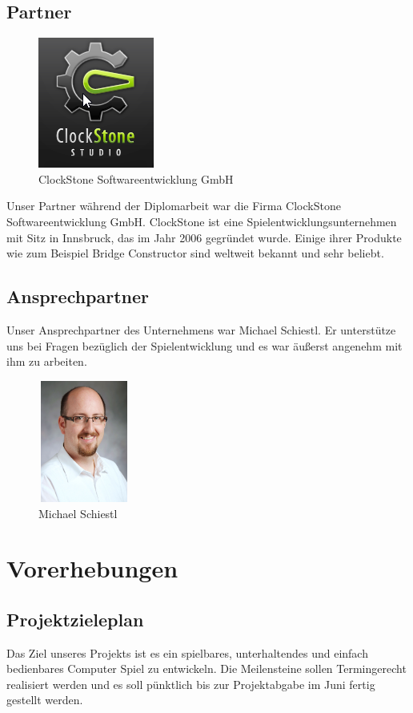 \newpage
\subsection{Partner}
\begin{figure}[H]
	\centering
	\includegraphics[]{images/ClockstoneLogo.png}
	\caption{ClockStone Softwareentwicklung GmbH}
\end{figure}
Unser Partner während der Diplomarbeit war die Firma ClockStone Softwareentwicklung GmbH. ClockStone ist eine Spielentwicklungsunternehmen mit Sitz in Innsbruck, das im Jahr 2006 gegründet wurde. Einige ihrer Produkte wie zum Beispiel Bridge Constructor sind weltweit bekannt und sehr beliebt. 


\subsection{Ansprechpartner}
Unser Ansprechpartner des Unternehmens war Michael Schiestl. Er unterstütze uns bei Fragen bezüglich der Spielentwicklung und es war äußerst angenehm mit ihm zu arbeiten.

\begin{figure}[H]
	\centering
	\includegraphics[width=3cm, height=4cm]{images/Landerer_Claudio.jpg}
	\caption{Michael Schiestl}
\end{figure}
\section{Vorerhebungen}
\subsection{Projektzieleplan}
\def \currentAuthor {Michael Leitner} Das Ziel unseres Projekts ist es ein spielbares, unterhaltendes und einfach bedienbares Computer
Spiel zu entwickeln. Die Meilensteine sollen Termingerecht realisiert werden und es soll pünktlich bis
zur Projektabgabe im Juni fertig gestellt werden.
\newpage

